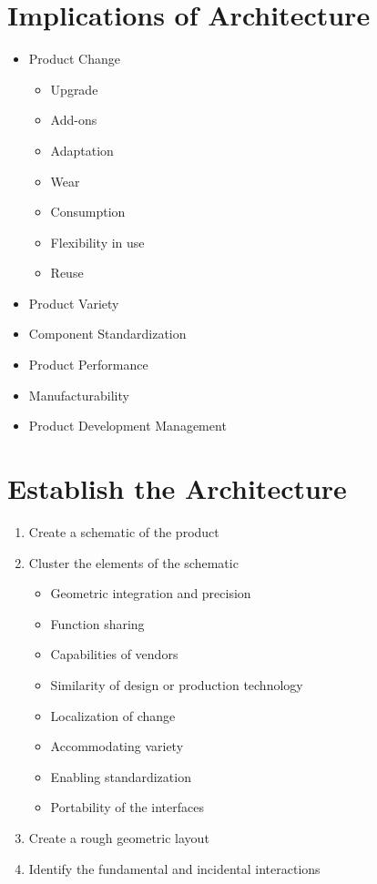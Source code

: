 \documentclass[openany,12pt,a4paper]{book}
\begin{document}
\section{Implications of Architecture}
\begin{itemize}
    \item Product Change
    \begin{itemize}
        \item Upgrade
        \item Add-ons
        \item Adaptation
        \item Wear
        \item Consumption
        \item Flexibility in use
        \item Reuse
    \end{itemize}
    \item Product Variety
    \item Component Standardization
    \item Product Performance
    \item Manufacturability
    \item Product Development Management
\end{itemize}
\section{Establish the Architecture}
\begin{enumerate}
    \item Create a schematic of the product
    \item Cluster the elements of the schematic
    \begin{itemize}
        \item Geometric integration and precision
        \item Function sharing
        \item Capabilities of vendors
        \item Similarity of design or production technology
        \item Localization of change
        \item Accommodating variety
        \item Enabling standardization
        \item Portability of the interfaces
    \end{itemize}
    \item Create a rough geometric layout
    \item Identify the fundamental and incidental interactions
\end{enumerate}
\end{document}
